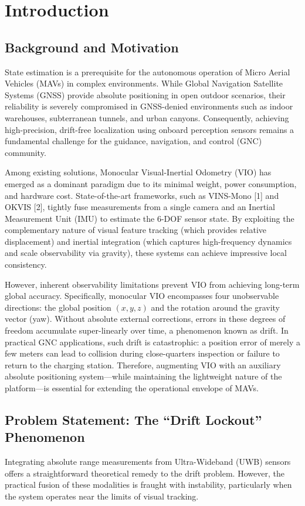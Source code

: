 \documentclass[conference]{IEEEtran}
\begin{document}
\section{Introduction}

\subsection{Background and Motivation}
State estimation is a prerequisite for the autonomous operation of Micro Aerial Vehicles (MAVs) in complex environments. While Global Navigation Satellite Systems (GNSS) provide absolute positioning in open outdoor scenarios, their reliability is severely compromised in GNSS-denied environments such as indoor warehouses, subterranean tunnels, and urban canyons. Consequently, achieving high-precision, drift-free localization using onboard perception sensors remains a fundamental challenge for the guidance, navigation, and control (GNC) community.

Among existing solutions, Monocular Visual-Inertial Odometry (VIO) has emerged as a dominant paradigm due to its minimal weight, power consumption, and hardware cost. State-of-the-art frameworks, such as VINS-Mono [1] and OKVIS [2], tightly fuse measurements from a single camera and an Inertial Measurement Unit (IMU) to estimate the 6-DOF sensor state. By exploiting the complementary nature of visual feature tracking (which provides relative displacement) and inertial integration (which captures high-frequency dynamics and scale observability via gravity), these systems can achieve impressive local consistency.

However, inherent observability limitations prevent VIO from achieving long-term global accuracy. Specifically, monocular VIO encompasses four unobservable directions: the global position $(x, y, z)$ and the rotation around the gravity vector (yaw). Without absolute external corrections, errors in these degrees of freedom accumulate super-linearly over time, a phenomenon known as drift. In practical GNC applications, such drift is catastrophic: a position error of merely a few meters can lead to collision during close-quarters inspection or failure to return to the charging station. Therefore, augmenting VIO with an auxiliary absolute positioning system—while maintaining the lightweight nature of the platform—is essential for extending the operational envelope of MAVs.

\subsection{Problem Statement: The ``Drift Lockout'' Phenomenon}
Integrating absolute range measurements from Ultra-Wideband (UWB) sensors offers a straightforward theoretical remedy to the drift problem. However, the practical fusion of these modalities is fraught with instability, particularly when the system operates near the limits of visual tracking.
\end{document}
